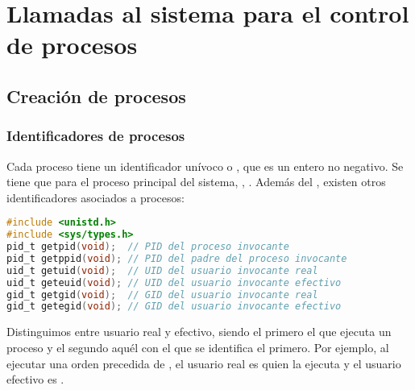 \section{Llamadas al sistema para el control de procesos}

\subsection{Creación de procesos}

\subsubsection{Identificadores de procesos}

Cada proceso tiene un identificador unívoco o , que es un entero no negativo.
Se tiene que para el proceso principal del sistema, , .
Además del , existen otros identificadores asociados a procesos:

\begin{lstlisting}[language=C]
#include <unistd.h>
#include <sys/types.h>
pid_t getpid(void);  // PID del proceso invocante
pid_t getppid(void); // PID del padre del proceso invocante
uid_t getuid(void);  // UID del usuario invocante real
uid_t geteuid(void); // UID del usuario invocante efectivo
gid_t getgid(void);  // GID del usuario invocante real
gid_t getegid(void); // GID del usuario invocante efectivo
\end{lstlisting}

Distinguimos entre usuario real y efectivo, siendo el primero el que ejecuta un proceso y el segundo aquél con el que se identifica el primero.
Por ejemplo, al ejecutar una orden precedida de , el usuario real es quien la ejecuta y el usuario efectivo es .

\subsubsection{}



\begin{lstlisting}[language=C]
\end{lstlisting}
\begin{lstlisting}[language=C]
\end{lstlisting}
\begin{lstlisting}[language=C]
\end{lstlisting}
\begin{lstlisting}[language=C]
\end{lstlisting}
\begin{lstlisting}[language=C]
\end{lstlisting}
\begin{lstlisting}[language=C]
\end{lstlisting}

